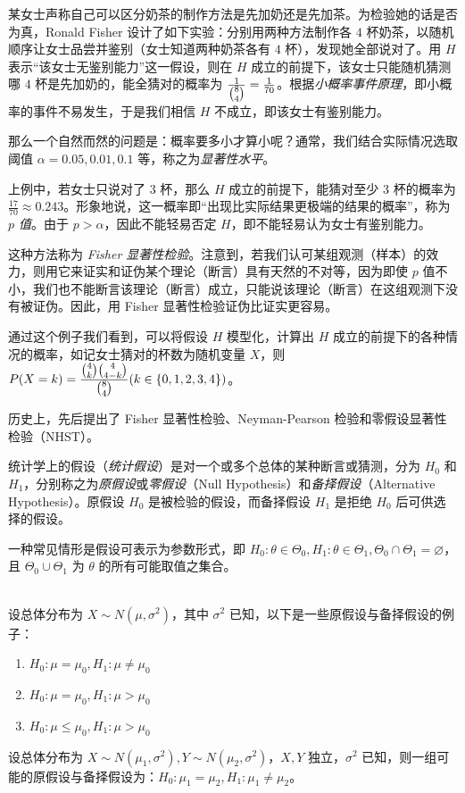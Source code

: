 \documentclass[../main.tex]{subfiles}
\begin{document}
\begin{example}
    某女士声称自己可以区分奶茶的制作方法是先加奶还是先加茶。为检验她的话是否为真，Ronald Fisher 设计了如下实验：分别用两种方法制作各 $4$ 杯奶茶，以随机顺序让女士品尝并鉴别（女士知道两种奶茶各有 $4$ 杯），发现她全部说对了。用 $H$ 表示“该女士无鉴别能力”这一假设，则在 $H$ 成立的前提下，该女士只能随机猜测哪 $4$ 杯是先加奶的，能全猜对的概率为 $\frac1{\tbinom 84}=\frac 1{70}$。根据\emph{小概率事件原理}，即小概率的事件不易发生，于是我们相信 $H$ 不成立，即该女士有鉴别能力。
\end{example}

那么一个自然而然的问题是：概率要多小才算小呢？通常，我们结合实际情况选取阈值 $\alpha=0.05,0.01,0.1$ 等，称之为\emph{显著性水平}。

上例中，若女士只说对了 $3$ 杯，那么 $H$ 成立的前提下，能猜对至少 $3$ 杯的概率为 $\frac{17}{70}\approx0.243$。形象地说，这一概率即“出现比实际结果更极端的结果的概率”，称为 \emph{$p$ 值}。由于 $p>\alpha$，因此不能轻易否定 $H$，即不能轻易认为女士有鉴别能力。

这种方法称为 \emph{Fisher 显著性检验}。注意到，若我们认可某组观测（样本）的效力，则用它来证实和证伪某个理论（断言）具有天然的不对等，因为即使 $p$ 值不小，我们也不能断言该理论（断言）成立，只能说该理论（断言）在这组观测下没有被证伪。因此，用 Fisher 显著性检验证伪比证实更容易。

通过这个例子我们看到，可以将假设 $H$ 模型化，计算出 $H$ 成立的前提下的各种情况的概率，如记女士猜对的杯数为随机变量 $X$，则 $P(X=k)=\frac{\tbinom 4k\tbinom 4{4-k}}{\tbinom 84}(k\in\{0,1,2,3,4\})$。

历史上，先后提出了 Fisher 显著性检验、Neyman-Pearson 检验和零假设显著性检验（NHST）。

统计学上的假设（\emph{统计假设}）是对一个或多个总体的某种断言或猜测，分为 $H_0$ 和 $H_1$，分别称之为\emph{原假设}或\emph{零假设}（Null Hypothesis）和\emph{备择假设}（Alternative Hypothesis）。原假设 $H_0$ 是被检验的假设，而备择假设 $H_1$ 是拒绝 $H_0$ 后可供选择的假设。

一种常见情形是假设可表示为参数形式，即 $H_0:\theta\in\Theta_0,H_1:\theta\in\Theta_1,\Theta_0\cap\Theta_1=\varnothing$，且 $\Theta_0\cup\Theta_1$ 为 $\theta$ 的所有可能取值之集合。

\begin{example}
    \mbox{}\\
    设总体分布为 $X\sim N(\mu,\sigma^2)$，其中 $\sigma^2$ 已知，以下是一些原假设与备择假设的例子：
    \begin{enumerate}
        \item $H_0:\mu=\mu_0,H_1:\mu\neq\mu_0$
        \item $H_0:\mu=\mu_0,H_1:\mu>\mu_0$
        \item $H_0:\mu\leq\mu_0,H_1:\mu>\mu_0$
    \end{enumerate}
    设总体分布为 $X\sim N(\mu_1,\sigma^2),Y\sim N(\mu_2,\sigma^2)$，$X,Y$ 独立，$\sigma^2$ 已知，则一组可能的原假设与备择假设为：$H_0:\mu_1=\mu_2,H_1:\mu_1\neq\mu_2$。
\end{example}
\end{document}
